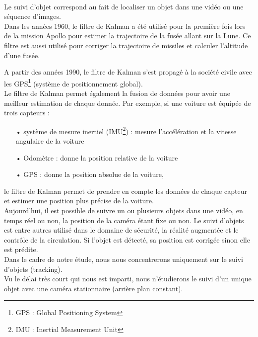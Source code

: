 \paragraph{}
	
	Le suivi d'objet correspond au fait de localiser un objet dans une vidéo ou une séquence d'images. \\
	
	Dans les années 1960, le filtre de Kalman a été utilisé pour la première fois lors de la mission Apollo pour estimer la trajectoire de la fusée allant sur la Lune. Ce filtre est aussi utilisé pour corriger la trajectoire de missiles et calculer l'altitude d'une fusée.

	A partir des années 1990, le filtre de Kalman s'est propagé à la société civile avec les GPS\footnote{GPS : Global Positioning System} (système de positionnement global). \\

	Le filtre de Kalman permet également la fusion de données pour avoir une meilleur estimation de chaque donnée. Par exemple, si une voiture est équipée de trois capteurs :
\begin{itemize}
\item[•] système de mesure inertiel (IMU\footnote{IMU : Inertial Measurement Unit}) : mesure l'accélération et la vitesse angulaire de la voiture 
\item[•] Odomètre : donne la position relative de la voiture 
\item[•] GPS : donne la position absolue de la voiture,
\end{itemize}	 
le filtre de Kalman permet de prendre en compte les données de chaque capteur et estimer une position plus précise de la voiture. \\

	Aujourd'hui, il est possible de suivre un ou plusieurs objets dans une vidéo, en temps réel ou non, la position de la caméra étant fixe ou non. Le suivi d'objets est entre autres utilisé dans le domaine de sécurité, la réalité augmentée et le contrôle de la circulation. Si l'objet est détecté, sa position est corrigée sinon elle est prédite. \\

	Dans le cadre de notre étude, nous nous concentrerons uniquement sur le suivi d'objets (tracking). \\
\indent Vu le délai très court qui nous est imparti, nous n'étudierons le suivi d'un unique objet avec une caméra stationnaire (arrière plan constant).